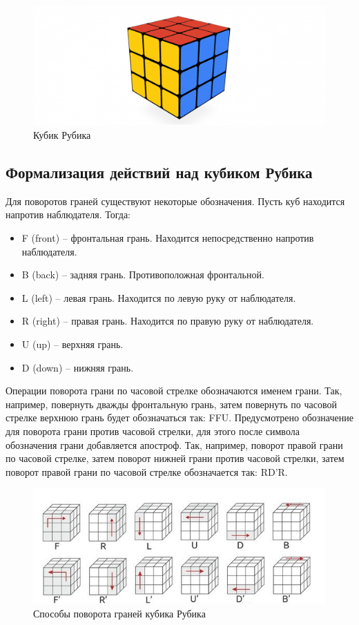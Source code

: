 \documentclass[a4paper, 14pt]{report} %
\begin{document}
	\begin{figure}[ht]
		\centering
		\includegraphics[width=1\linewidth]{rubicks_cube}
		\caption{Кубик Рубика}
		\label{fig:rubicks_cube}
	\end{figure}

	\subsection{Формализация действий над кубиком Рубика}
	Для поворотов граней существуют некоторые обозначения. Пусть куб находится напротив наблюдателя. Тогда:
	
	\begin{itemize}
		\item F (front) – фронтальная грань. Находится непосредственно напротив наблюдателя.
		\item B (back) – задняя грань. Противоположная фронтальной.
		\item L (left) – левая грань. Находится по левую руку от наблюдателя.
		\item R (right) – правая грань. Находится по правую руку от наблюдателя.
		\item U (up) – верхняя грань.
		\item D (down) – нижняя грань.
	\end{itemize}

	Операции поворота грани по часовой стрелке обозначаются именем грани. Так, например, повернуть дважды фронтальную грань, затем повернуть по часовой стрелке верхнюю грань будет обозначаться так: FFU. Предусмотрено обозначение для поворота грани против часовой стрелки, для этого после символа обозначения грани добавляется апостроф. Так, например, поворот правой грани по часовой стрелке, затем поворот нижней грани против часовой стрелки, затем поворот правой грани по часовой стрелке обозначается так: RD’R.
	
	\begin{figure}[ht]
		\centering
		\includegraphics[width=1\linewidth]{cube_rotations}
		\caption{Способы поворота граней кубика Рубика}
		\label{fig:cube_rotations}
	\end{figure}
	
\end{document}
